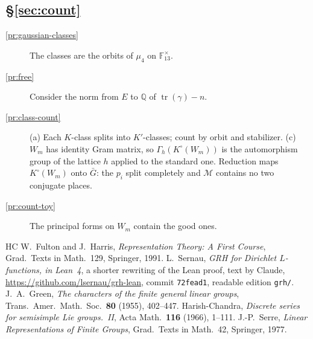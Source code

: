 \documentclass[reqno]{amsart}
\theoremstyle{plain}
\theoremstyle{definition}
\theoremstyle{remark}
\newcommand{\Q}{\mathbb{Q}}
\newcommand{\F}{\mathbb{F}}
\newcommand{\Gb}{\bar G}
\newcommand{\Mcal}{\mathcal M}
\newcommand{\tr}{\operatorname{tr}}
\begin{document}
\subsection*{\S\ref{sec:count}}
\begin{description}
\item[\ref{pr:gaussian-classes}] The classes are the orbits of \(\mu_4\) on \(\F_{13}^\times\).
\item[\ref{pr:free}] Consider the norm from \(E\) to \(\Q\) of \(\tr(\gamma) - n\).
\item[\ref{pr:class-count}] (a) Each \(K\)-class splits into \(K'\)-classes; count by orbit and stabilizer.  (c) \(W_m\) has identity Gram matrix, so \(\Gamma_h(K^\circ(W_m))\) is the automorphism group of the lattice \(h\) applied to the standard one.  Reduction maps \(K^\circ(W_m)\) onto \(\Gb\): the \(p_i\) split completely and \(\Mcal\) contains no two conjugate places.
\item[\ref{pr:count-toy}] The principal forms on \(W_m\) contain the good ones.
\end{description}

{\small
\begin{thebibliography}{HC}
 W.~Fulton and J.~Harris, \emph{Representation Theory: A First Course}, Grad.\ Texts in Math.\ 129, Springer, 1991.
 L.~Sernau, \emph{GRH for Dirichlet \(L\)-functions, in Lean~4}, a shorter rewriting of the Lean proof, text by Claude, \url{https://github.com/lsernau/grh-lean}, commit \texttt{72fead1}, readable edition \texttt{grh/}.
 J.~A.~Green, \emph{The characters of the finite general linear groups}, Trans.\ Amer.\ Math.\ Soc.\ \textbf{80} (1955), 402--447.
 Harish-Chandra, \emph{Discrete series for semisimple Lie groups.~II}, Acta Math.\ \textbf{116} (1966), 1--111.
 J.-P.~Serre, \emph{Linear Representations of Finite Groups}, Grad.\ Texts in Math.\ 42, Springer, 1977.
\end{thebibliography}
}
\end{document}
